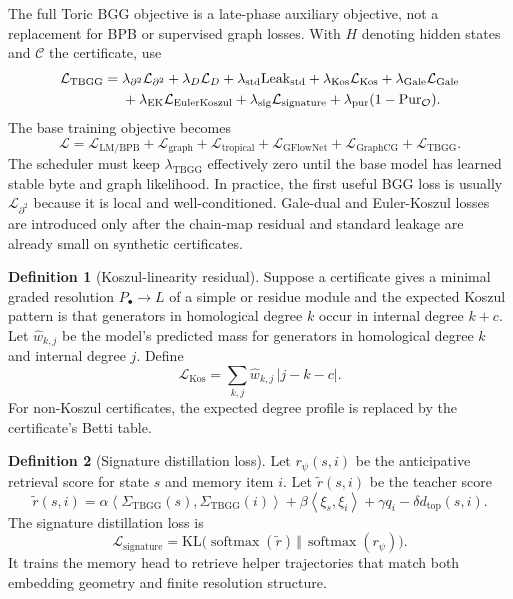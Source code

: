 \documentclass[11pt]{article}
\theoremstyle{definition}
\newtheorem{definition}{Definition}[section]
\theoremstyle{plain}
\theoremstyle{remark}
\numberwithin{equation}{section}
\newcommand{\softmax}{\operatorname{softmax}}
\newcommand{\abs}[1]{\left\lvert #1\right\rvert}
\newcommand{\ip}[2]{\left\langle #1,#2\right\rangle}
\begin{document}
The full Toric BGG objective is a late-phase auxiliary objective, not a replacement for BPB or supervised graph losses.  With $H$ denoting hidden states and $\mathcal C$ the certificate, use
\begin{align}
  \mathcal L_{\mathrm{TBGG}}={}&
  \lambda_{\partial^2}\mathcal L_{\partial^2}
  +\lambda_D\mathcal L_D
  +\lambda_{\mathrm{std}}\mathrm{Leak}_{\mathrm{std}}
  +\lambda_{\mathrm{Kos}}\mathcal L_{\mathrm{Kos}}
  +\lambda_{\mathrm{Gale}}\mathcal L_{\mathrm{Gale}}\notag\\
  &+\lambda_{\mathrm{EK}}\mathcal L_{\mathrm{EulerKoszul}}
  +\lambda_{\mathrm{sig}}\mathcal L_{\mathrm{signature}}
  +\lambda_{\mathrm{pur}}(1-\mathrm{Pur}_{\mathcal O}).
\end{align}
The base training objective becomes
\begin{equation}
  \mathcal L=\mathcal L_{\mathrm{LM/BPB}}+\mathcal L_{\mathrm{graph}}+\mathcal L_{\mathrm{tropical}}+\mathcal L_{\mathrm{GFlowNet}}+\mathcal L_{\mathrm{GraphCG}}+\mathcal L_{\mathrm{TBGG}}.
\end{equation}
The scheduler must keep $\lambda_{\mathrm{TBGG}}$ effectively zero until the base model has learned stable byte and graph likelihood.  In practice, the first useful BGG loss is usually $\mathcal L_{\partial^2}$ because it is local and well-conditioned.  Gale-dual and Euler-Koszul losses are introduced only after the chain-map residual and standard leakage are already small on synthetic certificates.

\begin{definition}[Koszul-linearity residual]\label{def:koszul-residual}
Suppose a certificate gives a minimal graded resolution $P_\bullet\to L$ of a simple or residue module and the expected Koszul pattern is that generators in homological degree $k$ occur in internal degree $k+c$.  Let $\widehat w_{k,j}$ be the model's predicted mass for generators in homological degree $k$ and internal degree $j$.  Define
\begin{equation}
  \mathcal L_{\mathrm{Kos}}=\sum_{k,j}\widehat w_{k,j}\,\abs{j-k-c}.
\end{equation}
For non-Koszul certificates, the expected degree profile is replaced by the certificate's Betti table.
\end{definition}

\begin{definition}[Signature distillation loss]\label{def:signature-distillation}
Let $r_\psi(s,i)$ be the anticipative retrieval score for state $s$ and memory item $i$.  Let $\widetilde r(s,i)$ be the teacher score
\begin{equation}
  \widetilde r(s,i)=\alpha\ip{\Sigma_{\mathrm{TBGG}}(s)}{\Sigma_{\mathrm{TBGG}}(i)}+\beta\ip{\xi_s}{\xi_i}+\gamma q_i-\delta d_{\mathrm{top}}(s,i).
\end{equation}
The signature distillation loss is
\begin{equation}
  \mathcal L_{\mathrm{signature}}=\mathrm{KL}\bigl(\softmax(\widetilde r)\,\Vert\,\softmax(r_\psi)\bigr).
\end{equation}
It trains the memory head to retrieve helper trajectories that match both embedding geometry and finite resolution structure.
\end{definition}
\end{document}

